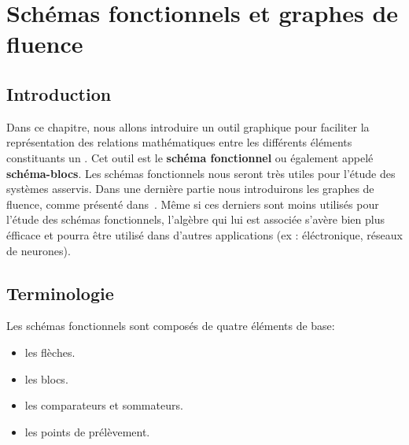 \chapter[Schéma fonctionnels]{Schémas fonctionnels et graphes de fluence\label{chap-schemabloc}}

\section{Introduction}
Dans ce chapitre, nous allons introduire un outil graphique pour faciliter 
la représentation des relations mathématiques entre les différents 
éléments constituants un \SLCI. Cet outil est le \textbf{schéma fonctionnel} ou 
également appelé \textbf{schéma-blocs}. Les schémas fonctionnels nous seront très 
utiles pour l'étude des systèmes asservis. Dans une dernière partie nous introduirons 
les graphes de fluence, comme présenté dans~\cite{Ostertag}. Même si ces derniers 
sont moins utilisés pour l'étude des schémas fonctionnels, l'algèbre qui lui est 
associée s'avère bien plus éfficace et pourra être utilisé dans d'autres 
applications (ex : éléctronique, réseaux de neurones).


\section{Terminologie}
Les schémas fonctionnels sont composés de quatre éléments de base:
\begin{itemize}
    \item les flèches.
    \item les blocs.
    \item les comparateurs et sommateurs.
    \item les points de prélèvement.
\end{itemize}

\newpage
